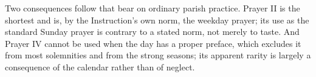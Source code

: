 Two consequences follow that bear on ordinary parish practice. Prayer II is the shortest and
is, by the Instruction's own norm, the weekday prayer; its use as the standard Sunday prayer is
contrary to a stated norm, not merely to taste. And Prayer IV cannot be used when the day has a
proper preface, which excludes it from most solemnities and from the strong seasons; its
apparent rarity is largely a consequence of the calendar rather than of neglect.
